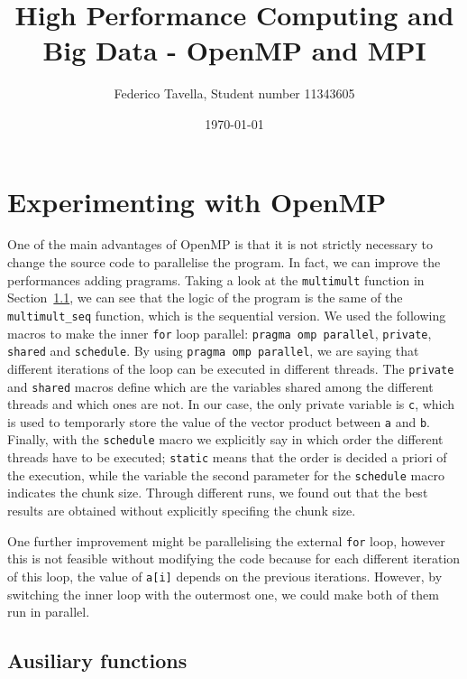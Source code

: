\documentclass[a4paper]{article}
\title{High Performance Computing and Big Data - OpenMP and MPI}
\author{Federico Tavella, Student number 11343605}
\date{\today}
\begin{document}
\maketitle

\section{Experimenting with OpenMP}

One of the main advantages of OpenMP is that it is not strictly necessary to change the source code to parallelise the program. In fact, we can improve the performances adding pragrams. Taking a look at the \texttt{multimult} function in Section~\ref{subsec:ausiliary}, we can see that the logic of the program is the same of the \texttt{multimult\_seq} function, which is the sequential version. We used the following macros to make the inner \texttt{for} loop parallel: \texttt{pragma omp parallel}, \texttt{private}, \texttt{shared} and \texttt{schedule}. By using \texttt{pragma omp parallel}, we are saying that different iterations of the loop can be executed in different threads. The \texttt{private} and \texttt{shared} macros define which are the variables shared among the different threads and which ones are not. In our case, the only private variable is \texttt{c}, which is used to temporarly store the value of the vector product between \texttt{a} and \texttt{b}. Finally, with the \texttt{schedule} macro we explicitly say in which order the different threads have to be executed; \texttt{static} means that the order is decided a priori of the execution, while the variable the second parameter for the \texttt{schedule} macro indicates the chunk size. Through different runs, we found out that the best results are obtained without explicitly specifing the chunk size.

One further improvement might be parallelising the external \texttt{for} loop, however this is not feasible without modifying the code because for each different iteration of this loop, the value of \texttt{a[i]} depends on the previous iterations. However, by switching the inner loop with the outermost one, we could make both of them run in parallel.

\subsection{Ausiliary functions}\label{subsec:ausiliary}
\end{document}
